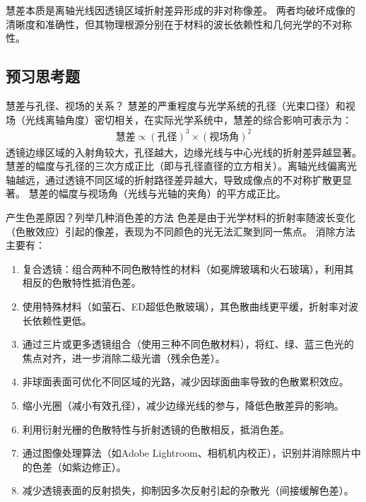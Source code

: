 \documentclass[dvipsnames, svgnames,a4paper,11pt]{article}
\begin{document}
慧差本质是离轴光线因透镜区域折射差异形成的非对称像差。
两者均破坏成像的清晰度和准确性，但其物理根源分别在于材料的波长依赖性和几何光学的不对称性。
\subsection{预习思考题}
\begin{question}
	慧差与孔径、视场的关系？
	\tcblower
	慧差的严重程度与光学系统的孔径（光束口径）和视场（光线离轴角度）密切相关，在实际光学系统中，慧差的综合影响可表示为：
	\begin{align*}
		\text{慧差}\propto (\text{孔径})^3\times(\text{视场角})^2
	\end{align*}
	透镜边缘区域的入射角较大，孔径越大，边缘光线与中心光线的折射差异越显著。慧差的幅度与孔径的三次方成正比（即与孔径直径的立方相关）。离轴光线偏离光轴越远，通过透镜不同区域的折射路径差异越大，导致成像点的不对称扩散更显著。
	慧差的幅度与视场角（光线与光轴的夹角）的平方成正比。
\end{question}

\begin{question}
	产生色差原因？列举几种消色差的方法
	\tcblower
	色差是由于光学材料的折射率随波长变化（色散效应）引起的像差，表现为不同颜色的光无法汇聚到同一焦点。
	消除方法主要有：
	\begin{enumerate}
		\item  复合透镜：组合两种不同色散特性的材料（如冕牌玻璃和火石玻璃），利用其相反的色散特性抵消色差。
		\item 使用特殊材料（如萤石、ED超低色散玻璃），其色散曲线更平缓，折射率对波长依赖性更低。
		\item 通过三片或更多透镜组合（使用三种不同色散材料），将红、绿、蓝三色光的焦点对齐，进一步消除二级光谱（残余色差）。
		\item 非球面表面可优化不同区域的光路，减少因球面曲率导致的色散累积效应。
		\item 缩小光圈（减小有效孔径），减少边缘光线的参与，降低色散差异的影响。
		\item 利用衍射光栅的色散特性与折射透镜的色散相反，抵消色差。
		\item 通过图像处理算法（如Adobe Lightroom、相机机内校正），识别并消除照片中的色差（如紫边修正）。
		\item 减少透镜表面的反射损失，抑制因多次反射引起的杂散光（间接缓解色差）。
	\end{enumerate}
\end{question}
\end{document}
